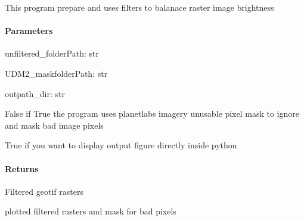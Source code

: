 \documentclass[letterpaper,10pt,english]{sphinxmanual}
\begin{document}
\begin{fulllineitems}
\label{\detokenize{akhdefo_functions:akhdefo_functions.Filter_PreProc.Filter_PreProcess}}
\pysigstartsignatures
{}
\pysigstopsignatures
\sphinxAtStartPar
This program prepare and uses filters to balanace raster image brightness


\paragraph{Parameters}
\label{\detokenize{akhdefo_functions:id26}}
\sphinxAtStartPar
unfiltered\_folderPath:  str

\sphinxAtStartPar
UDM2\_maskfolderPath:    str

\sphinxAtStartPar
outpath\_dir:    str
\begin{description}
\sphinxAtStartPar
False if True the program uses planetlabs imagery unusable pixel mask to ignore and mask bad image pixels

\sphinxAtStartPar
True if you want to display output figure directly inside python

\end{description}


\paragraph{Returns}
\label{\detokenize{akhdefo_functions:id27}}\begin{description}
\sphinxAtStartPar
Filtered geotif rasters

\sphinxAtStartPar
plotted filtered rasters and mask for bad pixels

\end{description}

\end{fulllineitems}
\end{document}
